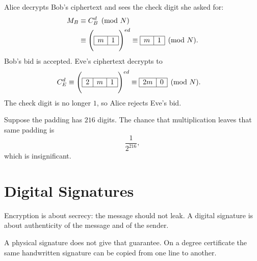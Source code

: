 Alice decrypts Bob's ciphertext and sees the check digit she asked for:
\begin{align*}
    M_{B}
    &\equiv C_{B}^{d}\pmod{N}\\
    &\equiv
    \Biggl(
        \begin{array}{|c|c|}
            \hline
            m & 1\\
            \hline
        \end{array}
    \Biggr)^{ed}
    \equiv
    \begin{array}{|c|c|}
        \hline
        m & 1\\
        \hline
    \end{array}
    \pmod{N}.
\end{align*}
Bob's bid is accepted. Eve's ciphertext decrypts to
\begin{align*}
    C_{E}^{d}
    &\equiv
    \Biggl(
        \begin{array}{|c|c|c|}
            \hline
            2 & m & 1\\
            \hline
        \end{array}
    \Biggr)^{ed}
    \equiv
    \begin{array}{|c|c|}
        \hline
        2m & 0\\
        \hline
    \end{array}
    \pmod{N}.
\end{align*}
The check digit is no longer $1$, so Alice rejects Eve's bid.

Suppose the padding has $216$ digits. The chance that multiplication
leaves that same padding is
\[
    \frac{1}{2^{216}},
\]
which is insignificant.

\section{Digital Signatures}

Encryption is about secrecy: the message should not leak. A digital
signature is about authenticity of the message and of the sender.

A physical signature does not give that guarantee. On a degree
certificate the same handwritten signature can be copied from one line
to another.

